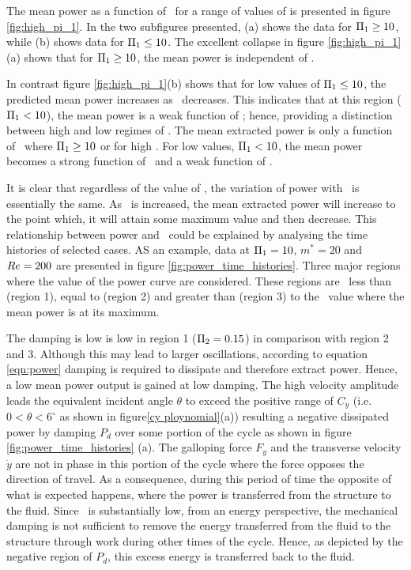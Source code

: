 The mean power as a function of \massdamp \ for a range of values of \massstiff is presented in figure \ref{fig:high_pi_1}. In the two subfigures presented, (a) shows the data for $\Pi_1 \geq 10$, while (b) shows data for $\Pi_1 \leq 10$.  The excellent collapse in figure \ref{fig:high_pi_1}(a) shows that for $\Pi_1 \geq 10$, the mean power is independent of \massstiff.

In contrast figure \ref{fig:high_pi_1}(b) shows that for low values of $\Pi_1 \leq 10$, the predicted mean power increases as \massdamp \ decreases. This indicates that at this region ($\Pi_1 < 10$), the mean power is a weak function of \massstiff; hence, providing a distinction between high and low regimes of \massstiff. The mean extracted power is only a function of \massdamp \ where $\Pi_1 \geq 10$ or for high \massstiff. For low values, $\Pi_1 < 10$, the mean power becomes a strong function of \massdamp \ and a weak function of \massstiff.

It is clear that regardless of the value of \massstiff, the variation of power with \massdamp \ is essentially the same. As \massdamp \ is increased, the mean extracted power will increase to the point which, it will attain some maximum value and then decrease. This relationship between power and \massdamp \ could be explained by analysing the time histories of selected cases. 
AS an example, data at $\Pi_1=10$, $m^*=20$ and $Re=200$ are presented in figure \ref{fig:power_time_histories}. Three major regions where the value of the power curve are considered. These regions are \massdamp\ less than (region 1), equal to (region 2) and greater than (region 3) to the \massdamp\ value where the mean power is at its maximum.



The damping is low is low in region 1 ($\Pi_2=0.15$) in comparison with region 2 and 3. Although this may lead to larger oscillations, according to equation \ref{eqn:power} damping is required to dissipate and therefore extract power. Hence, a low mean power output is gained at low damping. The high velocity amplitude leads the equivalent incident angle $\theta$ to exceed the positive range of $C_y$ (i.e. $0<\theta<6^\circ$ as shown in figure\ref{cy ploynomial}(a)) resulting a negative dissipated power by damping $P_d$ over some portion of the cycle as shown in figure \ref{fig:power_time_histories} (a). The galloping force $F_y$ and the transverse velocity $\dot{y}$ are not in phase in this portion of the cycle where the force opposes the direction of travel. As a consequence, during this period of time the opposite of what is expected happens, where the power is transferred from the structure to the fluid. Since \massdamp \ is substantially low, from an energy perspective, the mechanical damping is not sufficient to remove the energy transferred from the fluid to the structure through work during other times of the cycle. Hence, as depicted by the negative region of $P_d$, this excess energy is transferred back to the fluid.



